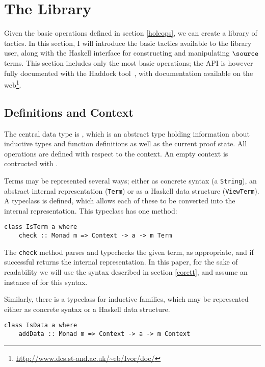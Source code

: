 \section{The \Ivor{} Library}

Given the basic operations defined in section \ref{holeops}, we can
create a library of tactics. In this section, I will introduce the
basic tactics available to the library user, along with the Haskell
interface for constructing and manipulating $\source$ terms. This
section includes only the most basic operations; the API is however
fully documented with the Haddock tool~\cite{haddock}, with
documentation available on the web\footnote{\url{http://www.dcs.st-and.ac.uk/~eb/Ivor/doc/}}.

\subsection{Definitions and Context}

The central data type is , which is an abstract type
holding information about inductive types and function definitions as
well as the current proof state. All operations are defined with
respect to the context. An empty context is contructed with
.

Terms may be represented several ways; either as concrete syntax (a
\texttt{String}), an abstract internal representation (\texttt{Term})
or as a Haskell data structure (\texttt{ViewTerm}). A typeclass
 is defined, which allows each of these to be converted
into the internal representation. This typeclass has one method:

\begin{verbatim}
class IsTerm a where
    check :: Monad m => Context -> a -> m Term
\end{verbatim}

The \texttt{check} method parses and typechecks the given term, as
appropriate, and if successful returns the internal representation. In
this paper, for the sake of readability we will use the syntax
described in section \ref{corett}, and assume an instance of
 for this syntax.

Similarly, there is a typeclass for inductive families,
which may be represented either as concrete syntax or a Haskell data
structure.

\begin{verbatim}
class IsData a where
    addData :: Monad m => Context -> a -> m Context
\end{verbatim}

